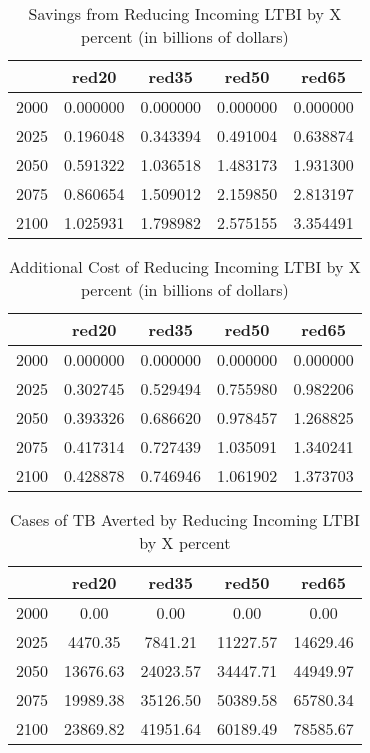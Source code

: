 \documentclass{article}
\begin{document}
\begin{table}[ht]
\centering
\begin{tabular}{|r|cccc|}
  \hline
 & red20 & red35 & red50 & red65 \\ 
  \hline
2000 & 0.000000 & 0.000000 & 0.000000 & 0.000000 \\ 
  2025 & 0.196048 & 0.343394 & 0.491004 & 0.638874 \\ 
  2050 & 0.591322 & 1.036518 & 1.483173 & 1.931300 \\ 
  2075 & 0.860654 & 1.509012 & 2.159850 & 2.813197 \\ 
  2100 & 1.025931 & 1.798982 & 2.575155 & 3.354491 \\ 
   \hline
\end{tabular}
\caption{Savings from Reducing Incoming LTBI by X percent (in billions of dollars)} 
\end{table}
\begin{table}[ht]
\centering
\begin{tabular}{|r|cccc|}
  \hline
 & red20 & red35 & red50 & red65 \\ 
  \hline
2000 & 0.000000 & 0.000000 & 0.000000 & 0.000000 \\ 
  2025 & 0.302745 & 0.529494 & 0.755980 & 0.982206 \\ 
  2050 & 0.393326 & 0.686620 & 0.978457 & 1.268825 \\ 
  2075 & 0.417314 & 0.727439 & 1.035091 & 1.340241 \\ 
  2100 & 0.428878 & 0.746946 & 1.061902 & 1.373703 \\ 
   \hline
\end{tabular}
\caption{Additional Cost of Reducing Incoming LTBI by X percent (in billions of dollars)} 
\end{table}
\begin{table}[ht]
\centering
\begin{tabular}{|r|cccc|}
  \hline
 & red20 & red35 & red50 & red65 \\ 
  \hline
2000 & 0.00 & 0.00 & 0.00 & 0.00 \\ 
  2025 & 4470.35 & 7841.21 & 11227.57 & 14629.46 \\ 
  2050 & 13676.63 & 24023.57 & 34447.71 & 44949.97 \\ 
  2075 & 19989.38 & 35126.50 & 50389.58 & 65780.34 \\ 
  2100 & 23869.82 & 41951.64 & 60189.49 & 78585.67 \\ 
   \hline
\end{tabular}
\caption{Cases of TB Averted by Reducing Incoming LTBI by X percent} 
\end{table}
\end{document}
